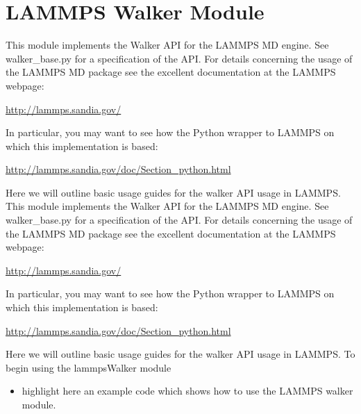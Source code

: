 \documentclass[letterpaper,10pt,english]{sphinxmanual}
\begin{document}
\section{LAMMPS Walker Module}
\label{walker_api/walker_api.doc:lammps-walker-module}
This module implements the Walker API for the LAMMPS MD engine. See walker\_base.py for a specification of the API. For details concerning the usage of the LAMMPS MD package see the excellent documentation at the LAMMPS webpage:

\href{http://lammps.sandia.gov/}{http://lammps.sandia.gov/}

In particular, you may want to see how the Python wrapper to LAMMPS on which this implementation is based:

\href{http://lammps.sandia.gov/doc/Section\_python.html}{http://lammps.sandia.gov/doc/Section\_python.html}

Here we will outline basic usage guides for the walker API usage in LAMMPS.
\label{walker_api/walker_api.doc:module-lammpsWalker}
This module implements the Walker API for the LAMMPS MD engine. See walker\_base.py for a specification of the API. For details concerning the usage of the LAMMPS MD package see the excellent documentation at the LAMMPS webpage:

\href{http://lammps.sandia.gov/}{http://lammps.sandia.gov/}

In particular, you may want to see how the Python wrapper to LAMMPS on which this implementation is based:

\href{http://lammps.sandia.gov/doc/Section\_python.html}{http://lammps.sandia.gov/doc/Section\_python.html}

Here we will outline basic usage guides for the walker API usage in LAMMPS. To begin using the lammpsWalker module
\begin{itemize}
\item {} 
highlight here an example code which shows how to use the LAMMPS walker module.

\end{itemize}
\end{document}
